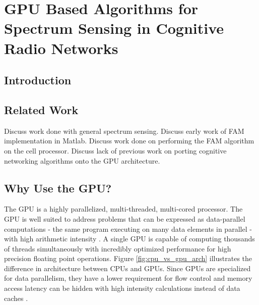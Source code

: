 \chapter{GPU Based Algorithms for Spectrum Sensing in Cognitive Radio Networks}
\label{chap:cognet_gpu}
\section{Introduction}


\section{Related Work}
Discuss work done with general spectrum sensing.
Discuss early work of FAM implementation in Matlab.
Discuss work done on performing the FAM algorithm on the cell processor.
Discuss lack of previous work on porting cognitive networking algorithms onto the GPU architecture.


\section{Why Use the GPU?}
The GPU is a highly parallelized, multi-threaded, multi-cored processor.  The GPU is well suited to address problems that can be expressed as data-parallel computations - the same program executing on many data elements in parallel - with high arithmetic intensity \cite{Nvidia08}.  A single GPU is capable of computing thousands of threads simultaneously with incredibly optimized performance for high precision floating point operations.  Figure \ref{fig:cpu_vs_gpu_arch} illustrates the difference in architecture between CPUs and GPUs.  Since GPUs are specialized for data parallelism, they have a lower requirement for flow control and memory access latency can be hidden with high intensity calculations instead of data caches \cite{Nvidia08}.  


